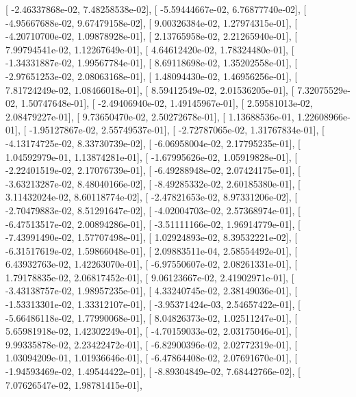 \documentclass{article}
\begin{document}
       [ -2.46337868e-02,   7.48258538e-02],
       [ -5.59444667e-02,   6.76877740e-02],
       [ -4.95667688e-02,   9.67479158e-02],
       [  9.00326384e-02,   1.27974315e-01],
       [ -4.20710700e-02,   1.09878928e-01],
       [  2.13765958e-02,   2.21265940e-01],
       [  7.99794541e-02,   1.12267649e-01],
       [  4.64612420e-02,   1.78324480e-01],
       [ -1.34331887e-02,   1.99567784e-01],
       [  8.69118698e-02,   1.35202558e-01],
       [ -2.97651253e-02,   2.08063168e-01],
       [  1.48094430e-02,   1.46956256e-01],
       [  7.81724249e-02,   1.08466018e-01],
       [  8.59412549e-02,   2.01536205e-01],
       [  7.32075529e-02,   1.50747648e-01],
       [ -2.49406940e-02,   1.49145967e-01],
       [  2.59581013e-02,   2.08479227e-01],
       [  9.73650470e-02,   2.50272678e-01],
       [  1.13688536e-01,   1.22608966e-01],
       [ -1.95127867e-02,   2.55749537e-01],
       [ -2.72787065e-02,   1.31767834e-01],
       [ -4.13174725e-02,   8.33730739e-02],
       [ -6.06958004e-02,   2.17795235e-01],
       [  1.04592979e-01,   1.13874281e-01],
       [ -1.67995626e-02,   1.05919828e-01],
       [ -2.22401519e-02,   2.17076739e-01],
       [ -6.49288948e-02,   2.07424175e-01],
       [ -3.63213287e-02,   8.48040166e-02],
       [ -8.49285332e-02,   2.60185380e-01],
       [  3.11432024e-02,   8.60118774e-02],
       [ -2.47821653e-02,   8.97331206e-02],
       [ -2.70479883e-02,   8.51291647e-02],
       [ -4.02004703e-02,   2.57368974e-01],
       [ -6.47513517e-02,   2.00894286e-01],
       [ -3.51111166e-02,   1.96914779e-01],
       [ -7.43991490e-02,   1.57707498e-01],
       [  1.02924893e-02,   8.39532221e-02],
       [ -6.31517619e-02,   1.59866048e-01],
       [  2.09883511e-04,   2.58554492e-01],
       [  6.43932763e-02,   1.42263070e-01],
       [ -6.97550607e-02,   2.08261331e-01],
       [  1.79178835e-02,   2.06817452e-01],
       [  9.06123667e-02,   2.41902971e-01],
       [ -3.43138757e-02,   1.98957235e-01],
       [  4.33240745e-02,   2.38149036e-01],
       [ -1.53313301e-02,   1.33312107e-01],
       [ -3.95371424e-03,   2.54657422e-01],
       [ -5.66486118e-02,   1.77990068e-01],
       [  8.04826373e-02,   1.02511247e-01],
       [  5.65981918e-02,   1.42302249e-01],
       [ -4.70159033e-02,   2.03175046e-01],
       [  9.99335878e-02,   2.23422472e-01],
       [ -6.82900396e-02,   2.02772319e-01],
       [  1.03094209e-01,   1.01936646e-01],
       [ -6.47864408e-02,   2.07691670e-01],
       [ -1.94593469e-02,   1.49544422e-01],
       [ -8.89304849e-02,   7.68442766e-02],
       [  7.07626547e-02,   1.98781415e-01],
\end{document}
